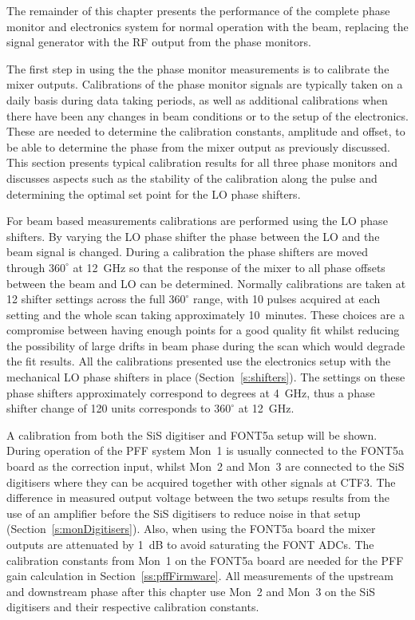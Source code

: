 
The remainder of this chapter presents the performance of the complete phase monitor and electronics system for normal operation with the beam, replacing the signal generator with the RF output from the phase monitors. 

The first step in using the the phase monitor measurements is to calibrate the mixer outputs. Calibrations of the phase monitor signals are typically taken on a daily basis during data taking periods, as well as additional calibrations when there have been any changes in beam conditions or to the setup of the electronics. These are needed to determine the calibration constants, amplitude and offset, to be able to determine the phase from the mixer output as previously discussed. This section presents typical calibration results for all three phase monitors and discusses aspects such as the stability of the calibration along the pulse and determining the optimal set point for the LO phase shifters. 

For beam based measurements calibrations are performed using the LO phase shifters. By varying the LO phase shifter the phase between the LO and the beam signal is changed. During a calibration the phase shifters are moved through \(360^\circ\) at 12~GHz  so that the response of the mixer to all phase offsets between the beam and LO can be determined. Normally calibrations are taken at 12 shifter settings across the full \(360^\circ\) range, with 10 pulses acquired at each setting and the whole scan taking approximately 10~minutes. These choices are a compromise between having enough points for a good quality fit whilst reducing the possibility of large drifts in beam phase during the scan which would degrade the fit results. All the calibrations presented use the electronics setup with the mechanical LO phase shifters in place (Section~\ref{s:shifters}). The settings on these phase shifters approximately correspond to degrees at 4~GHz, thus a phase shifter change of 120 units corresponds to \(360^\circ\) at 12~GHz.

A calibration from both the SiS digitiser and FONT5a setup will be shown. During operation of the PFF system Mon~1 is usually connected to the FONT5a board as the correction input, whilst Mon~2 and Mon~3 are connected to the SiS digitisers where they can be acquired together with other signals at CTF3. The difference in measured output voltage between the two setups results from the use of an amplifier before the SiS digitisers to reduce noise in that setup (Section~\ref{s:monDigitisers}). Also, when using the FONT5a board the mixer outputs are attenuated by 1~dB to avoid saturating the FONT ADCs. The calibration constants from Mon~1 on the FONT5a board are needed for the PFF gain calculation in Section~\ref{ss:pffFirmware}. All measurements of the upstream and downstream phase after this chapter use Mon~2 and Mon~3 on the SiS digitisers and their respective calibration constants.

